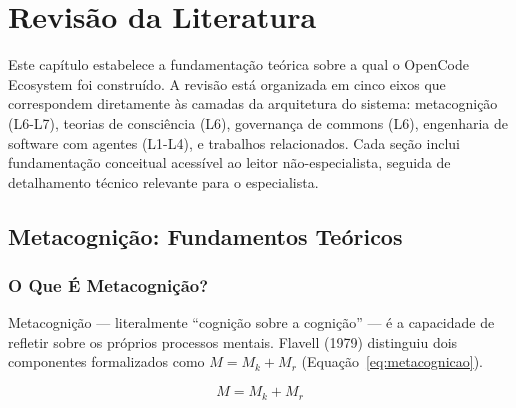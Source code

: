 \chapter{Revisão da Literatura}
\label{ch:literatura}

Este capítulo estabelece a fundamentação teórica sobre a qual o OpenCode Ecosystem foi construído. A revisão está organizada em cinco eixos que correspondem diretamente às camadas da arquitetura do sistema: metacognição (L6-L7), teorias de consciência (L6), governança de commons (L6), engenharia de software com agentes (L1-L4), e trabalhos relacionados. Cada seção inclui fundamentação conceitual acessível ao leitor não-especialista, seguida de detalhamento técnico relevante para o especialista.

\section{Metacognição: Fundamentos Teóricos}

\subsection{O Que É Metacognição?}

Metacognição — literalmente ``cognição sobre a cognição'' — é a capacidade de refletir sobre os próprios processos mentais. Flavell (1979) distinguiu dois componentes formalizados como $M = M_k + M_r$ (Equação~\ref{eq:metacognicao}).

\begin{equation}
M = M_k + M_r
\label{eq:metacognicao}
\end{equation}

